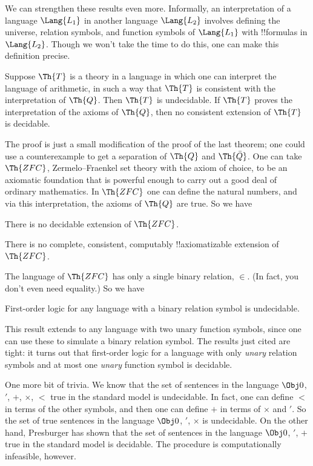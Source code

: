 \documentclass[../../../include/open-logic-section]{subfiles}
\begin{document}


We can strengthen these results even more. Informally, an
interpretation of a language $\Lang{L_1}$ in another language
$\Lang{L_2}$ involves defining the universe, relation symbols, and
function symbols of $\Lang{L_1}$ with !!{formula}s in
$\Lang{L_2}$. Though we won't take the time to do this, one can make
this definition precise.

\begin{thm}
  Suppose $\Th{T}$ is a theory in a language in which one can
  interpret the language of arithmetic, in such a way that $\Th{T}$ is
  consistent with the interpretation of $\Th{Q}$. Then $\Th{T}$ is
  undecidable. If $\Th{T}$ proves the interpretation of the axioms of
  $\Th{Q}$, then no consistent extension of $\Th{T}$ is decidable.
\end{thm}

The proof is just a small modification of the proof of the last
theorem; one could use a counterexample to get a separation of $\Th{Q}$ and
$\Th{\bar Q}$. One can take $\Th{ZFC}$, Zermelo--Fraenkel set theory with the
axiom of choice, to be an axiomatic foundation that is powerful enough
to carry out a good deal of ordinary mathematics. In $\Th{ZFC}$ one
can define the natural numbers, and via this interpretation, the
axioms of $\Th{Q}$ are true. So we have

\begin{cor}
There is no decidable extension of $\Th{ZFC}$.
\end{cor}

\begin{cor}
There is no complete, consistent, computably !!{axiomatizable} extension of
$\Th{ZFC}$. 
\end{cor}

The language of $\Th{ZFC}$ has only a single binary relation,
$\in$. (In fact, you don't even need equality.) So we have

\begin{cor}
First-order logic for any language with a binary relation symbol is
undecidable.
\end{cor}

This result extends to any language with two unary function symbols,
since one can use these to simulate a binary relation symbol. The
results just cited are tight: it turns out that first-order logic for
a language with only \emph{unary} relation symbols and at most one
\emph{unary} function symbol is decidable.

One more bit of trivia. We know that the set of sentences in the
language $\Obj 0$, $'$, $+$, $\times$, $<$ true in the standard model
is undecidable. In fact, one can define $<$ in terms of the other
symbols, and then one can define $+$ in terms of $\times$ and $'$. So
the set of true sentences in the language $\Obj 0$, $'$, $\times$ is
undecidable. On the other hand, Presburger has shown that the set of
sentences in the language $\Obj 0$, $'$, $+$ true in the standard model
is decidable. The procedure is computationally infeasible,
however.
\end{document}
